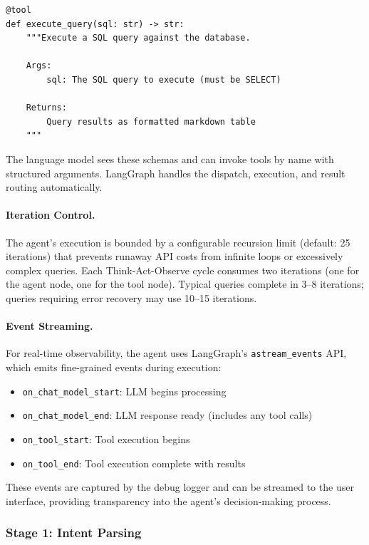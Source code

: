 \begin{verbatim}
@tool
def execute_query(sql: str) -> str:
    """Execute a SQL query against the database.

    Args:
        sql: The SQL query to execute (must be SELECT)

    Returns:
        Query results as formatted markdown table
    """
\end{verbatim}

The language model sees these schemas and can invoke tools by name with structured arguments. LangGraph handles the dispatch, execution, and result routing automatically.

\paragraph{Iteration Control.}
The agent's execution is bounded by a configurable recursion limit (default: 25 iterations) that prevents runaway API costs from infinite loops or excessively complex queries. Each Think-Act-Observe cycle consumes two iterations (one for the agent node, one for the tool node). Typical queries complete in 3--8 iterations; queries requiring error recovery may use 10--15 iterations.

\paragraph{Event Streaming.}
For real-time observability, the agent uses LangGraph's \texttt{astream\_events} API, which emits fine-grained events during execution:

\begin{itemize}
    \item \texttt{on\_chat\_model\_start}: LLM begins processing
    \item \texttt{on\_chat\_model\_end}: LLM response ready (includes any tool calls)
    \item \texttt{on\_tool\_start}: Tool execution begins
    \item \texttt{on\_tool\_end}: Tool execution complete with results
\end{itemize}

These events are captured by the debug logger and can be streamed to the user interface, providing transparency into the agent's decision-making process.

\subsubsection{Stage 1: Intent Parsing}

